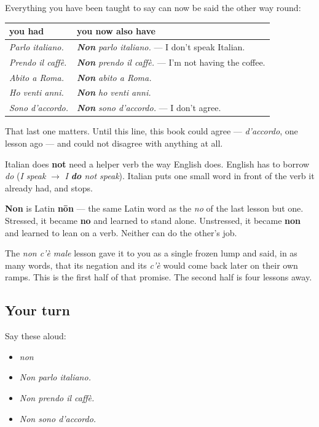 Everything you have been taught to say can now be said the other way round:

\noindent
\begin{tabularx}{\linewidth}{@{}>{\raggedright\arraybackslash}X>{\raggedright\arraybackslash}X@{}}
\toprule
\textbf{you had} & \textbf{you now also have} \\
\midrule
\emph{Parlo italiano.} & \emph{\textbf{Non} parlo italiano.} — I don't speak Italian. \\
\emph{Prendo il caffè.} & \emph{\textbf{Non} prendo il caffè.} — I'm not having the coffee. \\
\emph{Abito a Roma.} & \emph{\textbf{Non} abito a Roma.} \\
\emph{Ho venti anni.} & \emph{\textbf{Non} ho venti anni.} \\
\emph{Sono d'accordo.} & \emph{\textbf{Non} sono d'accordo.} — I don't agree. \\
\bottomrule
\end{tabularx}

That last one matters. Until this line, this book could agree — \emph{d'accordo}, one lesson ago — and could not disagree with anything at all.

Italian does \textbf{not} need a helper verb the way English does. English has to borrow \emph{do} (\emph{I speak} $\to$ \emph{I \textbf{do} not speak}). Italian puts one small word in front of the verb it already had, and stops.

\begin{cousinweb}
\textbf{Non} is Latin \textbf{nōn} — the same Latin word as the \emph{no} of the last lesson but one. Stressed, it became \textbf{no} and learned to stand alone. Unstressed, it became \textbf{non} and learned to lean on a verb. Neither can do the other's job.

The \emph{non c'è male} lesson gave it to you as a single frozen lump and said, in as many words, that its negation and its \emph{c'è} would come back later on their own ramps. This is the first half of that promise. The second half is four lessons away.
\end{cousinweb}

\subsection*{Your turn}
Say these aloud:

\begin{itemize}
\raggedright
  \item \emph{non}
  \item \emph{Non parlo italiano.}
  \item \emph{Non prendo il caffè.}
  \item \emph{Non sono d'accordo.}
\end{itemize}

